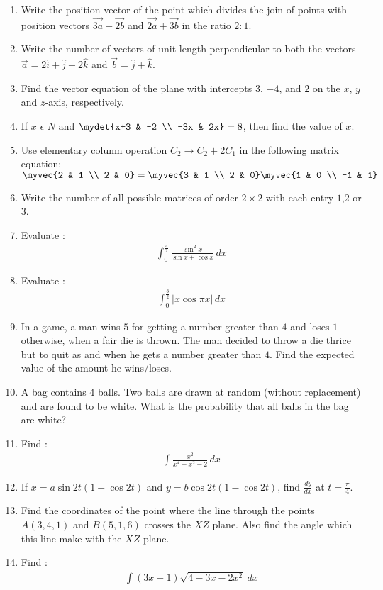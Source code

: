 \documentclass[12pt,-letter paper]{article}
\begin{document}
\begin{enumerate}
\item Write the position vector of the point which divides the join of points with position vectors $ \overrightarrow{3a} - \overrightarrow{2b}$ and $\overrightarrow{2a}+\overrightarrow{3b}$ in the ratio $2:1$.
\item Write the number of vectors of unit length perpendicular to both the vectors
	$\overrightarrow{a} = 2\hat{i} + \hat{j} + 2\hat{k}$  and $\overrightarrow{b} = \hat{j} + \hat{k}$.
\item Find the vector equation of the plane with intercepts $3$, $- 4$, and $2$ on the $x$, $y$ and $z$-axis, respectively.
\item If $x$ $\epsilon$ $N$ and $\mydet{x+3 & -2 \\ -3x & 2x}=8$, then find the value of $x$.
\item Use elementary column operation $C_2 \rightarrow C_{2}+2C_{1}$ in the following  matrix  equation:\\ $\myvec{2 & 1 \\  2 & 0}=\myvec{3 & 1 \\ 2 & 0}\myvec{1 & 0 \\ -1 & 1}$
\item  Write the number of all possible matrices of order \(2\times 2\) with each entry $1$,$2$ or $3$.
\item Evaluate : 
\begin{align} 
\int_{0}^{\frac{\pi}{2}} \frac{\sin^2 x}{\sin x + \cos x} \, dx
\end{align}
\item Evaluate :
\begin{align}
\int_{0}^\frac{3}{2}\left| x \cos \pi x \right| \, dx
\end{align}
\item In a game, a man wins \rupee $ 5$  for getting a number greater than $4$ and loses \rupee $1$ otherwise, when a fair die is thrown. The man decided to throw a die thrice but to quit as and when he gets a number greater than $4$. Find the expected value of the amount he wins/loses.
\item  A bag contains $4$ balls. Two balls are drawn at random (without replacement) and are found to be white. What is the probability that all balls in the bag are white?
\item Find :                    
\begin{align}                                    
\int \frac{x^2}{x^4 + x^2 - 2} \, dx   
\end{align}
\item If $ x=a \sin 2t (1 + \cos 2t)$ and $ y=b \cos 2t (1 - \cos 2t)$, find $\frac{dy}{dx}$ at $ t = \frac{\pi}{4}$.
\item Find the coordinates of the point where the line through the points $ A(3,4,1) $ and $B(5,1,6)$ crosses the $XZ$ plane. Also find the angle which this line make with the $XZ$ plane.
\item Find :
\begin{align}  
\int (3x+1)\sqrt {4-3x-2x^2} \ dx    
\end{align}


\end{enumerate}
\end{document}
